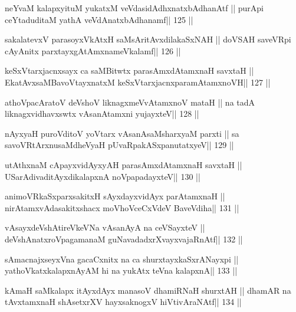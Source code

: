 \begin{shl}
neYvaM kalapxyituM yukatxM veVdasidAdhxnatxbAdhanAtf ||
purA\s pi ceYtaduditaM yathA veVdAnatxbAdhanamf\hfill || 125 ||
\end{shl}

\begin{shl}
sakalatevxV parasoyxVkAtxH saMsAritAvxdilakaSxNAH ||
doVSAH saveVR\s pi cA\s\s yAnitx parxtayxgAtAmxnameVkalamf\hfill || 126 ||
\end{shl}

\begin{shl}
keSxVtarxjacnxsayx ca saMBitwtx parasAmxdAtamxnaH savxtaH ||
EkatAvxsaMBavoV\s tayxnatxM keSxVtarxjacnxparamAtamxnoVH\hfill || 127 ||
\end{shl}

\begin{shl}
athoVpacAratoV deVshoV liknagxmeVvA\s\s tamxnoV mataH ||
na tadA liknagxvidhavxswtx vAsanA\s\s tamxni yujayxteV\hfill || 128 ||
\end{shl}

\begin{shl}
nAyxyaH puroVditoV yoV\s tarx vAsanAsaMsharxyaM parxti ||
sa savoVR\s tArxnusaMdheVyaH pUvaRpakASxpanutatxyeV\hfill || 129 ||
\end{shl}

\begin{shl}
utAthxnaM cApayxvidAyxyAH parasAmxdAtamxnaH savxtaH ||
USarAdivaditAyxdikalapxnA noVpapadayxteV\hfill || 130 ||
\end{shl}

\begin{shl}
animoVRkaSxparxsakitxH sAyxdayxvidAyx parAtamxnaH ||
nirAtamxvAdasakitxshacx moVhoVceCxVdeV BaveVdiha\hfill || 131 ||
\end{shl}

\begin{shl}
vAsayxdeVshAtireVkeVNa vAsanAyA na ceVSayxteV ||
deVshAnatxroVpagamanaM guNavadadxrXvayxvajaRnAtf\hfill || 132 ||
\end{shl}

\begin{shl}
sAmacnajxseyxVna gacaCxnitx na ca shurxtayxkaSxrANayxpi ||
yathoVkatxkalapxnAyAM hi na yukAtx teVna kalapxnA\hfill || 133 ||
\end{shl}

\begin{shl}
kAmaH saMkalapx itAyxdAyx manasoV dhamiRNaH shurxtAH ||
dhamAR na tAvxtamxnaH shAsetxrXV hayxsaknogxV hiVtivAraNAtf\hfill || 134 ||
\end{shl}

